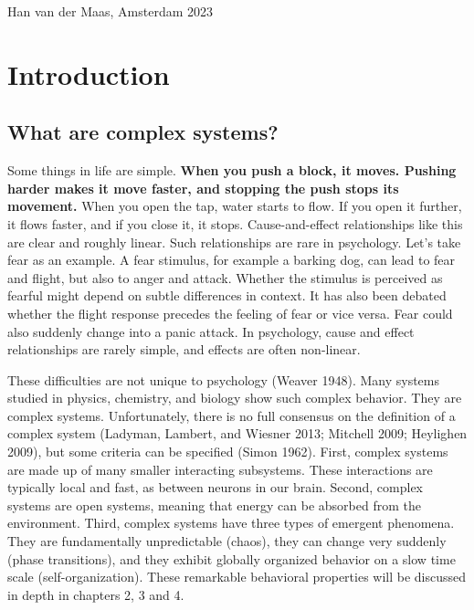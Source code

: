 \documentclass[
  letterpaper,
]{scrbook}
\begin{document}
Han van der Maas, Amsterdam 2023


\hypertarget{introduction}{%
\chapter{Introduction}\label{introduction}}

\hypertarget{what-are-complex-systems}{%
\section{What are complex systems?}\label{what-are-complex-systems}}

Some things in life are simple. \textbf{When you push a block, it moves.
Pushing harder makes it move faster, and stopping the push stops its
movement.} When you open the tap, water starts to flow. If you open it
further, it flows faster, and if you close it, it stops.
Cause-and-effect relationships like this are clear and roughly linear.
Such relationships are rare in psychology. Let's take fear as an
example. A fear stimulus, for example a barking dog, can lead to fear
and flight, but also to anger and attack. Whether the stimulus is
perceived as fearful might depend on subtle differences in context. It
has also been debated whether the flight response precedes the feeling
of fear or vice versa. Fear could also suddenly change into a panic
attack. In psychology, cause and effect relationships are rarely simple,
and effects are often non-linear.

These difficulties are not unique to psychology (Weaver 1948). Many
systems studied in physics, chemistry, and biology show such complex
behavior. They are complex systems. Unfortunately, there is no full
consensus on the definition of a complex system (Ladyman, Lambert, and
Wiesner 2013; Mitchell 2009; Heylighen 2009), but some criteria can be
specified (Simon 1962). First, complex systems are made up of many
smaller interacting subsystems. These interactions are typically local
and fast, as between neurons in our brain. Second, complex systems are
open systems, meaning that energy can be absorbed from the environment.
Third, complex systems have three types of emergent phenomena. They are
fundamentally unpredictable (chaos), they can change very suddenly
(phase transitions), and they exhibit globally organized behavior on a
slow time scale (self-organization). These remarkable behavioral
properties will be discussed in depth in chapters 2, 3 and 4.
\end{document}

